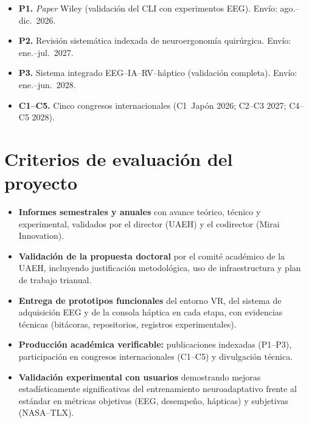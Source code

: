\documentclass[12pt]{article}
\begin{document}
\begin{itemize}
    \item \textbf{P1.} \textit{Paper} Wiley (validación del CLI
    con experimentos EEG). Envío: ago.--dic.\ 2026.
    \item \textbf{P2.} Revisión sistemática indexada de
    neuroergonomía quirúrgica. Envío: ene.--jul.\ 2027.
    \item \textbf{P3.} Sistema integrado EEG--IA--RV--háptico
    (validación completa). Envío: ene.--jun.\ 2028.
    \item \textbf{C1--C5.} Cinco congresos internacionales
    (C1~Japón 2026; C2--C3 2027; C4--C5 2028).
\end{itemize}


\section{Criterios de evaluación del proyecto}

\begin{itemize}
    \item \textbf{Informes semestrales y anuales} con avance
    teórico, técnico y experimental, validados por el director
    (UAEH) y el codirector (Mirai Innovation).
    \item \textbf{Validación de la propuesta doctoral} por el
    comité académico de la UAEH, incluyendo justificación
    metodológica, uso de infraestructura y plan de trabajo
    trianual.
    \item \textbf{Entrega de prototipos funcionales} del entorno
    VR, del sistema de adquisición EEG y de la consola háptica en
    cada etapa, con evidencias técnicas (bitácoras, repositorios,
    registros experimentales).
    \item \textbf{Producción académica verificable:}
    publicaciones indexadas (P1--P3), participación en congresos
    internacionales (C1--C5) y divulgación técnica.
    \item \textbf{Validación experimental con usuarios}
    demostrando mejoras estadísticamente significativas del
    entrenamiento neuroadaptativo frente al estándar en métricas
    objetivas (EEG, desempeño, hápticas) y subjetivas
    (NASA--TLX).
\end{itemize}
\end{document}
